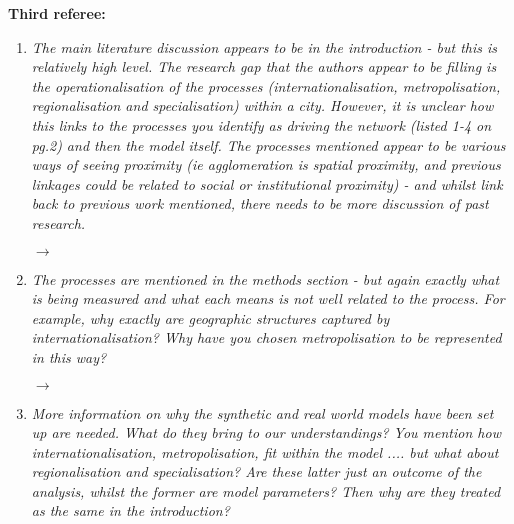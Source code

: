 \documentclass[10pt,a4paper,sans]{moderncv}        %
\begin{document}
\bigskip

\textbf{Third referee:}

\medskip


\begin{enumerate}

	\item \textit{The main literature discussion appears to be in the introduction - but this is relatively high level. The research gap that the authors appear to be filling is the operationalisation of the processes (internationalisation, metropolisation, regionalisation and specialisation) within a city. However, it is unclear how this links to the processes you identify as driving the network (listed 1-4 on pg.2) and then the model itself. The processes mentioned appear to be various ways of seeing proximity (ie agglomeration is spatial proximity, and previous linkages could be related to social or institutional proximity) - and whilst link back to previous work mentioned, there needs to be more discussion of past research.}
	
	$\rightarrow$ 
	
	\medskip

	\item \textit{The processes are mentioned in the methods section - but again exactly what is being measured and what each means is not well related to the process. For example, why exactly are geographic structures captured by internationalisation? Why have you chosen metropolisation to be represented in this way?}

	$\rightarrow$ 
	
	\medskip

	\item \textit{More information on why the synthetic and real world models have been set up are needed. What do they bring to our understandings? You mention how internationalisation, metropolisation, fit within the model .... but what about regionalisation and specialisation? Are these latter just an outcome of the analysis, whilst the former are model parameters? Then why are they treated as the same in the introduction?}


\end{enumerate}
\end{document}
